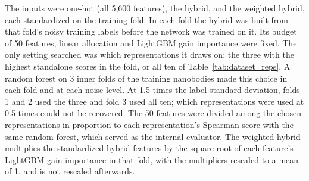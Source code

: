The inputs were one-hot (all 5,600 features), the hybrid, and the weighted hybrid, each standardized on the training fold. In each fold the hybrid was built from that fold's noisy training labels before the network was trained on it. Its budget of 50 features, linear allocation and LightGBM gain importance were fixed. The only setting searched was which representations it draws on: the three with the highest standalone scores in the fold, or all ten of Table~\ref{tab:dataset_reps}. A random forest on 3 inner folds of the training nanobodies made this choice in each fold and at each noise level. At 1.5 times the label standard deviation, folds 1 and 2 used the three and fold 3 used all ten; which representations were used at 0.5 times could not be recovered. The 50 features were divided among the chosen representations in proportion to each representation's Spearman score with the same random forest, which served as the internal evaluator. The weighted hybrid multiplies the standardized hybrid features by the square root of each feature's LightGBM gain importance in that fold, with the multipliers rescaled to a mean of 1, and is not rescaled afterwards.

